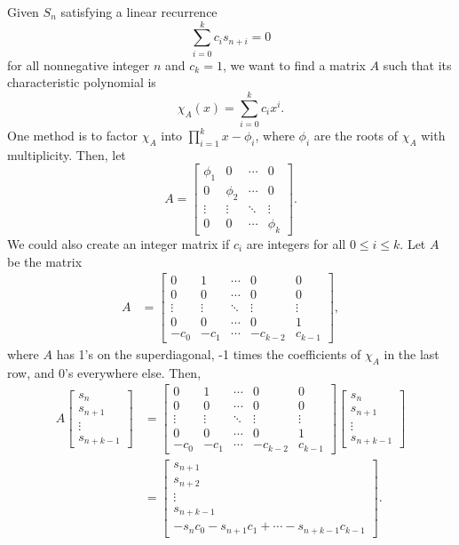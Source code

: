 \documentclass[11pt]{article}
\begin{document}
Given $S_{n}$ satisfying a linear recurrence 
\begin{equation*}
\sum_{i=0}^{k}{c_{i}s_{n+i}}=0
\end{equation*}
for all nonnegative integer $n$ and $c_{k}=1$, we want to find a matrix $A$ such that its characteristic polynomial is
\begin{equation*}
\chi_{A}(x)=\sum_{i=0}^{k}{c_{i}x^{i}}.
\end{equation*}
One method is to factor $\chi_{A}$ into $\displaystyle\prod_{i=1}^{k}{x-\phi_{i}}$, where $\phi_{i}$ are the roots of $\chi_{A}$ with multiplicity. Then, let 
\begin{equation*}
A=
\begin{bmatrix}
\phi_{1} & 0 & \cdots & 0\\
0 & \phi_{2} & \cdots & 0\\
\vdots & \vdots & \ddots & \vdots\\
0 & 0 & \cdots & \phi_{k}
\end{bmatrix}.
\end{equation*}
We could also create an integer matrix if $c_{i}$ are integers for all $0\leq i\leq k$. Let $A$ be the matrix
\begin{align*}
A&=
\begin{bmatrix}
0 & 1 &\cdots & 0 & 0\\
0 & 0 & \cdots & 0 & 0\\
\vdots & \vdots & \ddots & \vdots &\vdots \\
0 & 0 & \cdots & 0 & 1\\
-c_{0} & -c_{1} & \cdots & -c_{k-2} & c_{k-1}
\end{bmatrix},
\end{align*}
where $A$ has 1's on the superdiagonal, -1 times the coefficients of $\chi_{A}$ in the last row, and 0's everywhere else. Then,
\begin{align*}
A
\begin{bmatrix}
s_{n}\\ s_{n+1}\\ \vdots \\ s_{n+k-1}
\end{bmatrix}
&=
\begin{bmatrix}
0 & 1 &\cdots & 0 & 0\\
0 & 0 & \cdots & 0 & 0\\
\vdots & \vdots & \ddots & \vdots &\vdots \\
0 & 0 & \cdots & 0 & 1\\
-c_{0} & -c_{1} & \cdots & -c_{k-2} & c_{k-1}
\end{bmatrix}
\begin{bmatrix}
s_{n}\\ s_{n+1}\\ \vdots \\ s_{n+k-1}
\end{bmatrix}\\
&=
\begin{bmatrix}
s_{n+1} \\ s_{n+2} \\ \vdots \\ s_{n+k-1} \\
-s_{n}c_{0}-s_{n+1}c_{1}+\cdots-s_{n+k-1}c_{k-1}
\end{bmatrix}.
\end{align*}
\end{document}
